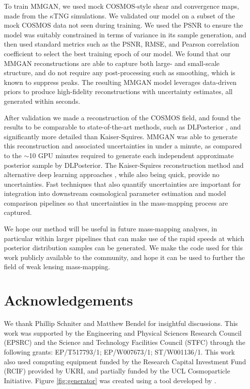 \documentclass[fleqn,usenatbib]{mnras}
\begin{document}
To train MMGAN, we used mock COSMOS-style shear and convergence maps, made from the $\kappa$TNG simulations. We validated our model on a subset of the mock COSMOS data not seen during training. We used the PSNR to ensure the model was suitably constrained in terms of variance in its sample generation, and then used standard metrics such as the PSNR, RMSE, and Pearson correlation coefficient to select the best training epoch of our model. We found that our MMGAN reconstructions are able to capture both large- and small-scale structure, and do not require any post-processing such as smoothing, which is known to suppress peaks. The resulting MMGAN model leverages data-driven priors to produce high-fidelity reconstructions with uncertainty estimates, all generated within seconds.

After validation we made a reconstruction of the COSMOS field, and found the results to be comparable to state-of-the-art methods, such as DLPosterior \citep{remy2023probabilistic}, and significantly more detailed than Kaiser-Squires. MMGAN was able to generate this reconstruction and associated uncertainties in under a minute, as compared to the $\sim$10 GPU minutes required to generate each independent approximate posterior sample by DLPosterior. The Kaiser-Squires reconstruction method \citep{kaiser1993mapping} and alternative deep learning approaches \citep{jeffrey2020deep,saxena2021generative}, while also being quick, provide no uncertainties.
%
Fast techniques that also quantify uncertainties are important for integration into downstream cosmological parameter estimation and model comparison pipelines so that uncertainties in the mass-mapping process are captured.

We hope our method will be useful in future mass-mapping analyses, in particular within larger pipelines that can make use of the rapid speeds at which posterior distribution samples can be generated. We make the code used for this work publicly available to the community, and hope it can be used to further the field of weak lensing mass-mapping.

\section*{Acknowledgements}

We thank Phillip Schniter and Matthew Bendel for insightful discussions. This work was supported by the Engineering and Physical Sciences Research Council (EPSRC) and the Science and Technology Facilities Council (STFC) through the following grants: EP/T517793/1; EP/W007673/1; ST/W001136/1. This work also used computing equipment funded by the Research Capital Investment Fund (RCIF) provided by UKRI, and partially funded by the UCL Cosmoparticle Initiative.
Figure \ref{fig:generator} was created using a tool developed by \citet{Iqbal2018PlotNeuralNet}.
\end{document}
